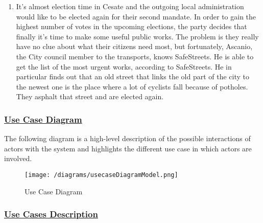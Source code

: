 \begin{enumerate}[label=\textbf{AS\arabic*}]
			\item \label{sce:advancedAuthority} It’s almost election time in Cesate and the outgoing local administration would like to be elected again for their second mandate. In order to gain the highest number of votes in the upcoming elections, the party decides that finally it’s time to make some useful public works. The problem is they really have no clue about what their citizens need most, but fortunately, Ascanio, the City council member to the transports, knows SafeStreets. He is able to get the list of the most urgent works, according to SafeStreets. He in particular finds out that an old street that links the old part of the city to the newest one is the place where a lot of cyclists fall because of potholes. They asphalt that street and are elected again.
		\end{enumerate}
	
		\newpage
		
	\subsubsection[Use Cases Diagrams]{\hyperlink{toc}{Use Case Diagram}}
		The following diagram is a high-level description of the possible interactions of actors with the system and highlights the different use case in which actors are involved.
		
		\vspace{1cm}
		
		\begin{figure}[h!]
			\centering
			\texttt{[image: /diagrams/usecaseDiagramModel.png]}
			\caption{Use Case Diagram}
		\end{figure}
	
		\FloatBarrier
	
	\subsubsection[Use Cases Description]{\hyperlink{toc}{Use Cases Description}}
		\label{sec:useCases}
		
